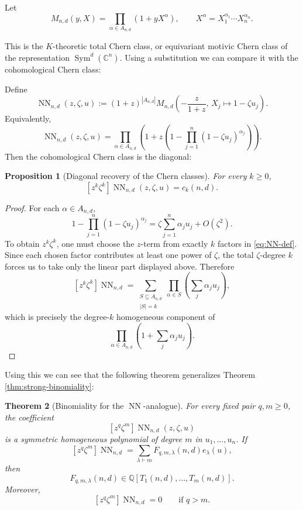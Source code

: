 \documentclass[10pt,a4paper]{amsart}
\numberwithin{equation}{section}
\newtheorem{theorem}{Theorem}[section]
\newtheorem{proposition}[theorem]{Proposition}
\DeclareMathOperator{\Sym}{Sym}
\newcommand{\Q}{\mathbb Q}
\newcommand{\NN}{\operatorname{NN}}
\begin{document}
Let
\[
  M_{n,d}(y,X)=\prod_{\alpha\in A_{n,d}}(1+yX^\alpha),
  \qquad X^\alpha=X_1^{\alpha_1}\cdots X_n^{\alpha_n}.
\]

This is the $K$-theoretic total Chern class, or equivariant motivic Chern class of the representation $\Sym^d(\mathbb C^n)$. Using a substitution we can compare it with the cohomological Chern class:

Define
\[
  \NN_{n,d}(z,\zeta,u):=
  (1+z)^{|A_{n,d}|}
  M_{n,d}\left(-\frac{z}{1+z},\,X_j\mapsto 1-\zeta u_j\right).
\]
Equivalently,
\begin{equation}\label{eq:NN-def}
  \NN_{n,d}(z,\zeta,u)=
  \prod_{\alpha\in A_{n,d}}
  \left(1+z\left(1-\prod_{j=1}^n(1-\zeta u_j)^{\alpha_j}\right)\right).
\end{equation}
Then the cohomological Chern class is the diagonal:
\begin{proposition}[Diagonal recovery of the Chern classes]\label{prop:NN-diagonal}
For every $k\ge0$,
\[
  [z^k\zeta^k]\NN_{n,d}(z,\zeta,u)=c_k(n,d).
\]
\end{proposition}

\begin{proof}
For each $\alpha\in A_{n,d}$,
\[
  1-\prod_{j=1}^n(1-\zeta u_j)^{\alpha_j}
  =\zeta\sum_{j=1}^n\alpha_j u_j+O(\zeta^2).
\]
To obtain $z^k\zeta^k$, one must choose the $z$-term from exactly $k$ factors in \eqref{eq:NN-def}.  Since each chosen factor contributes at least one power of $\zeta$, the total $\zeta$-degree $k$ forces us to take only the linear part displayed above.  Therefore
\[
  [z^k\zeta^k]\NN_{n,d}
  =\sum_{\substack{S\subseteq A_{n,d}\\ |S|=k}}
  \prod_{\alpha\in S}\left(\sum_j\alpha_j u_j\right),
\]
which is precisely the degree-$k$ homogeneous component of
\[
  \prod_{\alpha\in A_{n,d}}
  \left(1+\sum_j\alpha_j u_j\right).
\]
\end{proof}
 Using this we can see that the following theorem generalizes Theorem \ref{thm:strong-binomiality}:

\begin{theorem}[Binomiality for the $\NN$-analogue]\label{thm:NN-binomiality}
For every fixed pair $q,m\ge0$, the coefficient
\[
  [z^q\zeta^m]\NN_{n,d}(z,\zeta,u)
\]
is a symmetric homogeneous polynomial of degree $m$ in $u_1,\ldots,u_n$.  If
\[
  [z^q\zeta^m]\NN_{n,d}
  =\sum_{\lambda\vdash m}F_{q,m,\lambda}(n,d)e_\lambda(u),
\]
then
\[
  F_{q,m,\lambda}(n,d)\in\Q[T_1(n,d),\ldots,T_m(n,d)].
\]
Moreover,
\[
  [z^q\zeta^m]\NN_{n,d}=0\qquad\text{if }q>m.
\]
\end{theorem}
\end{document}
